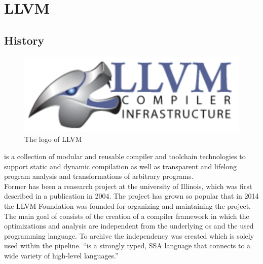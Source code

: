 \chapter{LLVM}
\section{History}
\begin{figure}
    \caption[The logo of LLVM]{The logo of LLVM \cite{llvmLogo}}
    \includegraphics[width=.5\textwidth]{gfx/llvmLogo.png}
\end{figure}
\llvm is a collection of modular and reusable compiler and toolchain technologies to support static and dynamic compilation as well as transparent and lifelong program analysis and transformations of arbitrary programs. \cite{LLVMWebsite, LLVMResearchBeginning}\\
Former \llvm has been a reasearch project at the university of Illinois, which was first described in a publication in 2004.
The project has grown so popular that in 2014 the LLVM Foundation was founded for organizing and maintaining the project. \cite{LLVMFoundation}\\
The main goal of \llvm consists of the creation of a compiler framework in which the optimizations and analysis are independent from the underlying os and the used programming language.
To archive the independency \llvmir was created which is solely used within the pipeline.
\enquote{\llvmir is a strongly typed, \ac{SSA} language that connects to a wide variety of high-level languages.} \cite{PolyhedralEmpiricalStudy}

